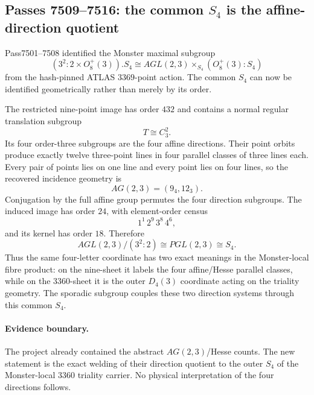 \subsection*{Passes 7509--7516: the common $S_4$ is the affine-direction quotient}

Pass7501--7508 identified the Monster maximal subgroup
\[
(3^2{:}2\times O_8^+(3)).S_4
\cong
AGL(2,3)\times_{S_4}(O_8^+(3):S_4)
\]
from the hash-pinned ATLAS $3369$-point action.  The common $S_4$ can now be
identified geometrically rather than merely by its order.

The restricted nine-point image has order $432$ and contains a normal regular
translation subgroup
\[
T\cong C_3^2.
\]
Its four order-three subgroups are the four affine directions.  Their point
orbits produce exactly twelve three-point lines in four parallel classes of
three lines each.  Every pair of points lies on one line and every point lies on
four lines, so the recovered incidence geometry is
\[
\boxed{AG(2,3)=(9_4,12_3).}
\]
Conjugation by the full affine group permutes the four direction subgroups.  The
induced image has order $24$, with element-order census
\[
1^1\,2^9\,3^8\,4^6,
\]
and its kernel has order $18$.  Therefore
\[
\boxed{AGL(2,3)/(3^2{:}2)\cong PGL(2,3)\cong S_4.}
\]
Thus the same four-letter coordinate has two exact meanings in the Monster-local
fibre product: on the nine-sheet it labels the four affine/Hesse parallel
classes, while on the $3360$-sheet it is the outer $D_4(3)$ coordinate acting on
the triality geometry.  The sporadic subgroup couples these two direction
systems through this common $S_4$.

\paragraph{Evidence boundary.}
The project already contained the abstract $AG(2,3)$/Hesse counts.  The new
statement is the exact welding of their direction quotient to the outer
$S_4$ of the Monster-local $3360$ triality carrier.  No physical interpretation
of the four directions follows.
